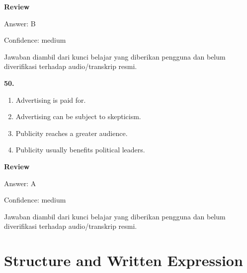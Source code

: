 \documentclass[12pt]{article}
\begin{document}
\par
\begingroup
\setlength{\parskip}{0pt}
\setlength{\parindent}{0pt}
\textbf{Review}\par
Answer: B\par
Confidence: medium\par
Jawaban diambil dari kunci belajar yang diberikan pengguna dan belum diverifikasi terhadap audio/transkrip resmi.\par
\endgroup
\par
\vspace{0.25\baselineskip}
\noindent\textbf{50.}
\begin{enumerate}[label=(\Alph*),leftmargin=*,itemsep=0.2em]
\item Advertising is paid for.
\item Advertising can be subject to skepticism.
\item Publicity reaches a greater audience.
\item Publicity usually benefits political leaders.
\end{enumerate}
\par
\begingroup
\setlength{\parskip}{0pt}
\setlength{\parindent}{0pt}
\textbf{Review}\par
Answer: A\par
Confidence: medium\par
Jawaban diambil dari kunci belajar yang diberikan pengguna dan belum diverifikasi terhadap audio/transkrip resmi.\par
\endgroup
\par
\vspace{0.25\baselineskip}
\section*{Structure and Written Expression}
\end{document}
